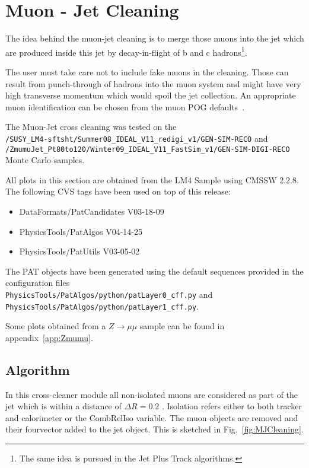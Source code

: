 \documentclass{cmspaper}
\begin{document}
\clearpage


\section{Muon - Jet Cleaning}
The idea behind the muon-jet cleaning is to merge those muons into the jet which
are produced inside this jet by decay-in-flight of b and c hadrons\footnote{The
same idea is pursued in the Jet Plus Track algorithms.}.

The user must take care not to include fake muons in the cleaning. Those can
result from punch-through of hadrons into the muon system and might have very
high transverse momentum which would spoil the jet collection. An appropriate
muon identification can be chosen from the muon POG defaults~\cite{muonID}.

The Muon-Jet cross cleaning was tested on the\\
\texttt{/SUSY\_LM4-sftsht/Summer08\_IDEAL\_V11\_redigi\_v1/GEN-SIM-RECO} and\\
\texttt{/ZmumuJet\_Pt80to120/Winter09\_IDEAL\_V11\_FastSim\_v1/GEN-SIM-DIGI-RECO}
Monte Carlo samples.

All plots in this section are obtained from the LM4 Sample using CMSSW 2.2.8.
The following CVS tags have been used on top of this release:
\begin{itemize}
    \item DataFormats/PatCandidates V03-18-09      
    \item PhysicsTools/PatAlgos     V04-14-25      
    \item PhysicsTools/PatUtils     V03-05-02      
\end{itemize}
The PAT objects
have been generated using the default sequences provided in the configuration
files\\
\texttt{PhysicsTools/PatAlgos/python/patLayer0\_cff.py} and\\
\texttt{PhysicsTools/PatAlgos/python/patLayer1\_cff.py}.

Some plots obtained from a $Z\rightarrow\mu\mu$ sample can be found in appendix~\ref{app:Zmumu}.


\subsection{Algorithm}
In this cross-cleaner module all non-isolated muons are considered as part of
the jet which is within a distance of $\Delta R=0.2$ . Isolation refers either
to both tracker and calorimeter or the CombRelIso variable. The muon objects
are removed and their fourvector added to the jet object. 
This is sketched in Fig.~\ref{fig:MJCleaning}.
\end{document}
